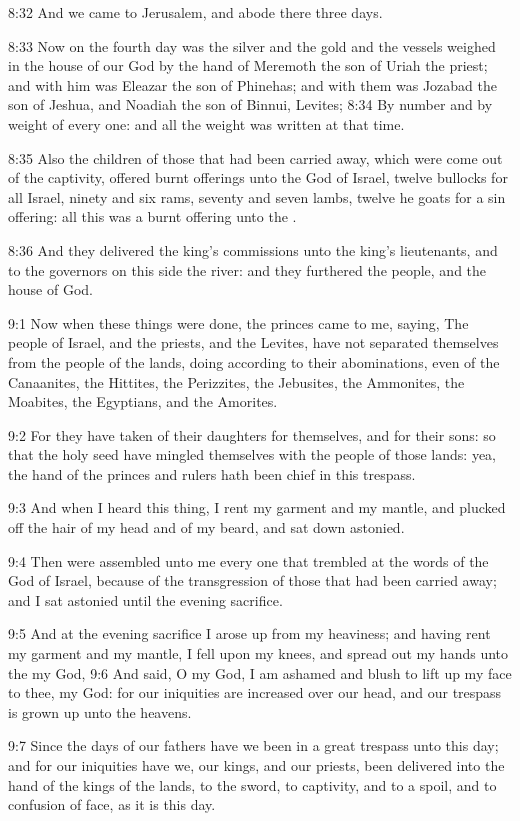 8:32 And we came to Jerusalem, and abode there three days.

8:33 Now on the fourth day was the silver and the gold and the vessels weighed in the house of our God by the hand of Meremoth the son of Uriah the priest; and with him was Eleazar the son of Phinehas; and with them was Jozabad the son of Jeshua, and Noadiah the son of Binnui, Levites; 8:34 By number and by weight of every one: and all the weight was written at that time.

8:35 Also the children of those that had been carried away, which were come out of the captivity, offered burnt offerings unto the God of Israel, twelve bullocks for all Israel, ninety and six rams, seventy and seven lambs, twelve he goats for a sin offering: all this was a burnt offering unto the \LORD.

8:36 And they delivered the king's commissions unto the king's lieutenants, and to the governors on this side the river: and they furthered the people, and the house of God.

9:1 Now when these things were done, the princes came to me, saying, The people of Israel, and the priests, and the Levites, have not separated themselves from the people of the lands, doing according to their abominations, even of the Canaanites, the Hittites, the Perizzites, the Jebusites, the Ammonites, the Moabites, the Egyptians, and the Amorites.

9:2 For they have taken of their daughters for themselves, and for their sons: so that the holy seed have mingled themselves with the people of those lands: yea, the hand of the princes and rulers hath been chief in this trespass.

9:3 And when I heard this thing, I rent my garment and my mantle, and plucked off the hair of my head and of my beard, and sat down astonied.

9:4 Then were assembled unto me every one that trembled at the words of the God of Israel, because of the transgression of those that had been carried away; and I sat astonied until the evening sacrifice.

9:5 And at the evening sacrifice I arose up from my heaviness; and having rent my garment and my mantle, I fell upon my knees, and spread out my hands unto the \LORD my God, 9:6 And said, O my God, I am ashamed and blush to lift up my face to thee, my God: for our iniquities are increased over our head, and our trespass is grown up unto the heavens.

9:7 Since the days of our fathers have we been in a great trespass unto this day; and for our iniquities have we, our kings, and our priests, been delivered into the hand of the kings of the lands, to the sword, to captivity, and to a spoil, and to confusion of face, as it is this day.

